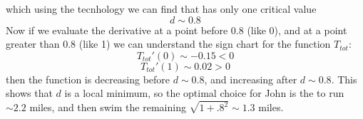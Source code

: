 \documentclass[10pt]{article}
\begin{document}
\begin{enumerate}
which using the tecnhology we can find that has only one critical value 
\[
d \sim 0.8
\]
Now if we evaluate the derivative at a point before $0.8$ (like 0), and at a point greater than $0.8$ (like 1) we can understand the sign chart for the function $T_{tot}$:
\[
T_{tot}'(0) \sim -0.15 <0
\]
\[
T_{tot}'(1) \sim 0.02 >0 
\]
then the function is decreasing before $d \sim 0.8$, and increasing after $d \sim 0.8$. This shows that $d$ is a local minimum, so the optimal choice for John is the to run $\sim 2.2$ miles, and then swim the remaining $\sqrt{1+.8^2}\sim 1.3$ miles.





    \vfill



\newpage











\end{enumerate}
\end{document}
